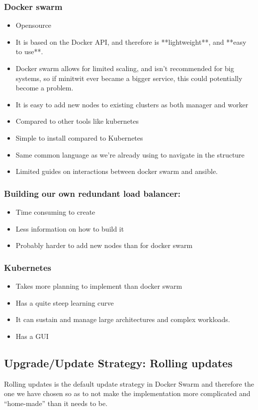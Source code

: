 \subsubsection{Docker swarm}

\cite{ansible:dockerswarm}
\begin{itemize}
    \item Opensource
    \item It is based on the Docker API, and therefore is **lightweight**, and **easy to use**.
    \item Docker swarm allows for limited scaling, and isn't recommended for big systems, so if minitwit ever became a bigger service, this could potentially become a problem.
    \item It is easy to add new nodes to existing clusters as both manager and worker
    \item Compared to other tools like kubernetes
    \item Simple to install compared to Kubernetes
    \item Same common language as we're already using to navigate in the structure
    \item Limited guides on interactions between docker swarm and ansible.
\end{itemize}

\subsubsection{Building our own redundant load balancer:}
\begin{itemize}
    \item Time consuming to create
    \item Less information on how to build it
    \item Probably harder to add new nodes than for docker swarm
\end{itemize}

\subsubsection{Kubernetes}
\begin{itemize}
    \item Takes more planning to implement than docker swarm
    \item Has a quite steep learning curve
    \item It can sustain and manage large architectures and complex workloads.
    \item Has a GUI
\end{itemize}

\subsection{Upgrade/Update Strategy: Rolling updates}

Rolling updates is the default update strategy in Docker Swarm and therefore the one we have chosen so as to not make the implementation more complicated and “home-made” than it needs to be.
